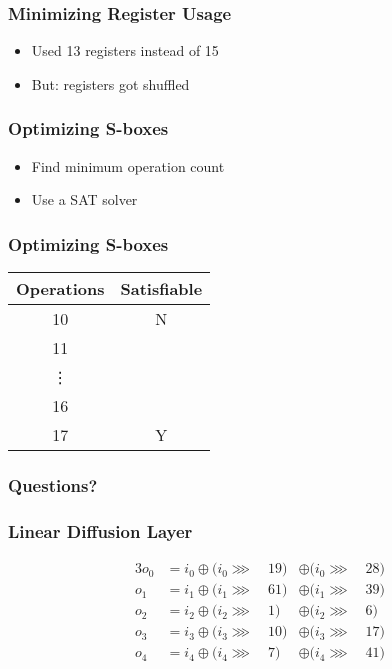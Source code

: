 \documentclass[17pt]{beamer}
\newcommand{\xor}[0]{\oplus}
\newcommand{\ror}[0]{\ggg}
\begin{document}
\begin{frame}
    \frametitle{Minimizing Register Usage}
    \begin{itemize}
        \item Used 13 registers instead of 15
        \item But: registers got shuffled
    \end{itemize}
\end{frame}

\begin{frame}
    \frametitle{Optimizing S-boxes}
    \begin{itemize}
        \item Find minimum operation count
        \item Use a SAT solver
    \end{itemize}
\end{frame}

\begin{frame}
    \frametitle{Optimizing S-boxes}
    \begin{center}
        \begin{tabular}{c c}
            Operations & Satisfiable \\ \hline
            10 & N \\
            11 & \\
            \vdots \\
            16 & \\
            17 & Y \\
        \end{tabular}
    \end{center}
\end{frame}

\begin{frame}
    \frametitle{Questions?}
\end{frame}

\begin{frame}[t]
    \frametitle{Linear Diffusion Layer}
    \begin{alignat*}{3}
        o_0 & = i_0 \xor (i_0 \ror \: & 19) & \xor (i_0 \ror \: & 28) \\
        o_1 & = i_1 \xor (i_1 \ror \: & 61) & \xor (i_1 \ror \: & 39) \\
        o_2 & = i_2 \xor (i_2 \ror \: &  1) & \xor (i_2 \ror \: &  6) \\
        o_3 & = i_3 \xor (i_3 \ror \: & 10) & \xor (i_3 \ror \: & 17) \\
        o_4 & = i_4 \xor (i_4 \ror \: &  7) & \xor (i_4 \ror \: & 41) \\
    \end{alignat*}
\end{frame}
\end{document}
